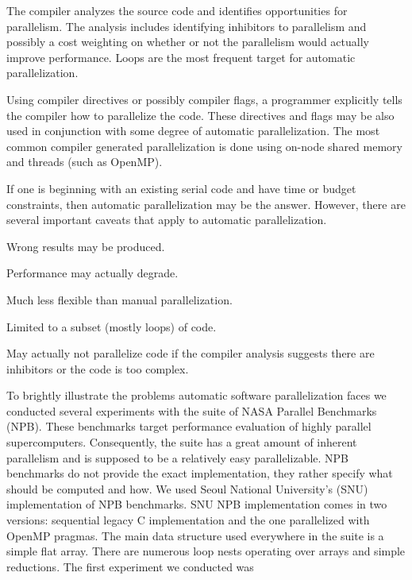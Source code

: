 \begin{description}[noitemsep]
\item[Fully Automatic] The compiler analyzes the source code and identifies opportunities for parallelism.
The analysis includes identifying inhibitors to parallelism and possibly a cost weighting on whether or not the parallelism would actually improve performance. Loops are the most frequent target for automatic parallelization. 
\item[Programmer Directed] Using compiler directives or possibly compiler flags, a programmer explicitly tells the compiler how to parallelize the code. These directives and flags may be also used in conjunction with some degree of automatic parallelization. The most common compiler generated parallelization is done using on-node shared memory and threads (such as OpenMP).
\end{description}
\quad If one is beginning with an existing serial code and have time or budget constraints, then automatic parallelization may be the answer. However, there are several important caveats that apply to automatic parallelization.
\begin{description}[itemsep=0mm]
\item[Correctness] Wrong results may be produced.
\item[Performance] Performance may actually degrade.
\item[Flexibility] Much less flexible than manual parallelization.
\item[Limitations] Limited to a subset (mostly loops) of code.
\item[Effectiveness] May actually not parallelize code if the compiler analysis suggests there are inhibitors or the code is too complex.
\end{description}

\quad To brightly illustrate the problems automatic software parallelization faces we conducted several experiments with the suite of NASA Parallel Benchmarks (NPB). These benchmarks target performance evaluation of highly parallel supercomputers. Consequently, the suite has a great amount of inherent parallelism and is supposed to be a relatively easy parallelizable. NPB benchmarks do not provide the exact implementation, they rather specify what should be computed and how. We used Seoul National University's (SNU) implementation of NPB benchmarks. SNU NPB implementation comes in two versions: sequential legacy C implementation and the one parallelized with OpenMP pragmas. The main data structure used everywhere in the suite is a simple flat array. There are numerous loop nests operating over arrays and simple reductions.\newline\null
\quad The first experiment we conducted was 




